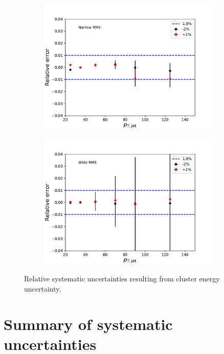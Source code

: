 \begin{figure}
\centering
\begin{subfigure}{0.45\textwidth}
\includegraphics[width=0.95\textwidth]{figures/systematics/SystematicErrorsGausRMS_Emcal.pdf}
\end{subfigure}
\begin{subfigure}{0.45\textwidth}
\includegraphics[width=0.95\textwidth]{figures/systematics/SystematicErrorsGammaRMS_Emcal.pdf}
\end{subfigure}
\caption{Relative systematic uncertainties resulting from cluster energy uncertainty.}
\label{fig:systemcal2}
\end{figure}


\FloatBarrier
\section{Summary of systematic uncertainties}


